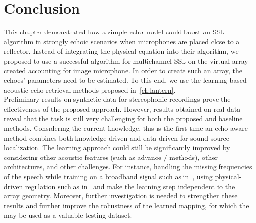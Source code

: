 \section{Conclusion}
This chapter demonstrated how a simple echo model could boost an SSL algorithm in strongly echoic scenarios when microphones are placed close to a reflector.
Instead of integrating the physical equation into their algorithm, we proposed to use a successful algorithm for multichannel SSL on the virtual array created accounting for image microphone.
In order to create such an array, the echoes' parameters need to be estimated.
To this end, we use the learning-based acoustic echo retrieval methods proposed in~\cref{ch:lantern}.
\\Preliminary results on synthetic data for stereophonic recordings prove the effectiveness of the proposed approach.
However, results obtained on real data reveal that the task is still very challenging for both the proposed and baseline methods.
Considering the current knowledge, this is the first time an echo-aware method combines both knowledge-driven and data-driven for sound source localization.
The learning approach could still be significantly improved by considering other acoustic features (such as advance \ReTF/ methods), other architectures, and other challenges.
For instance, handling the missing frequencies of the speech while training on a broadband signal such as in~,
using physical-driven regulation such as in~ and make the learning step independent to the array geometry.
Moreover, further investigation is needed to strengthen these results and further improve the robustness of the learned mapping, for which the \dEchorate may be used as a valuable testing dataset.